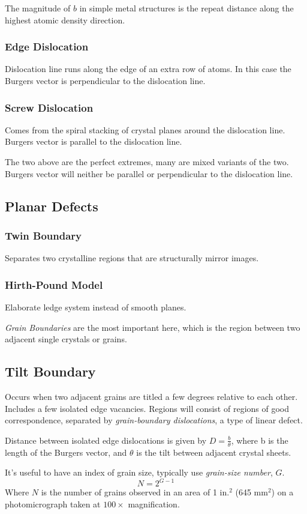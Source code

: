 \documentclass[10pt,letterpaper]{article}
\begin{document}
	The magnitude of $b$ in simple metal structures is the repeat distance along the highest atomic density direction. 
	\subsubsection{Edge Dislocation}
	Dislocation line runs along the edge of an extra row of atoms.  In this case the Burgers vector is perpendicular to the dislocation line. 
	\subsubsection{Screw Dislocation}
	Comes from the spiral stacking of crystal planes around the dislocation line.  Burgers vector is parallel to the dislocation line. 
	
	The two above are the perfect extremes, many are mixed variants of the two. Burgers vector will neither be parallel or perpendicular to the dislocation line. 
	\subsection{Planar Defects}
	\subsubsection{Twin Boundary}
	Separates two crystalline regions that are structurally mirror images. 
	\subsubsection{Hirth-Pound Model}
	Elaborate ledge system instead of smooth planes.  
	
	\textit{Grain Boundaries} are the most important here, which is the region between two adjacent single crystals or grains. 
	\subsection{Tilt Boundary}
	Occurs when two adjacent grains are titled a few degrees relative to each other.  Includes a few isolated edge vacancies.  Regions will consist of regions of good correspondence, separated by \textit{grain-boundary dislocations}, a type of linear defect. 
	
	Distance between isolated edge dislocations is given by $D = \frac{b}{\theta}$, where b is the length of the Burgers vector, and $\theta$ is the tilt between adjacent crystal sheets. 
	
	It's useful to have an index of grain size, typically use \textit{grain-size number}, $G$.
	$$
	N = 2^{G-1}
	$$
	Where $N$ is the number of grains observed in an area of 1 in.$^2$ (645 mm$^2$) on a photomicrograph taken at $100 \times$ magnification. 
	
\end{document}
